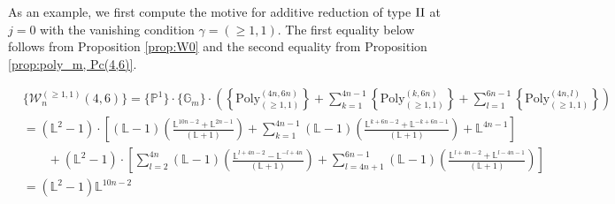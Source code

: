 \documentclass[a4paper,12pt]{amsart}
\theoremstyle{definition}
\newcommand{\cW}{\mathcal{W}}
\newcommand{\Me}{\overline{\mathcal{M}}_{1,1}}
\newcommand{\II}{{\mathop{\rm II}}}
\newcommand{\Pb}{\mathbb{P}}
\newcommand{\Gb}{\mathbb{G}}
\newcommand{\Lb}{\mathbb{L}}
\DeclareMathOperator{\PGL}{PGL}
\begin{document}
	As an example, we first compute the motive for additive reduction of type $\II$ at $j=0$ with the vanishing condition $\gamma = (\ge 1,1)$. The first equality below follows from Proposition \ref{prop:W0} and the second equality from Proposition \ref{prop:poly_m, Pc(4,6)}. 
	
	\begin{align*}
		&\{\cW_{n}^{(\ge 1,1)}(4,6)\}= \{\Pb^1\} \cdot \{\Gb_m\} \cdot \left(\left\{\mathrm{Poly}_{(\ge 1,1)}^{(4n,6n)}\right\}+\sum_{k=1}^{4n-1}\left\{\mathrm{Poly}_{(\ge 1,1)}^{(k,6n)}\right\}+\sum_{l=1}^{6n-1}\left\{\mathrm{Poly}_{(\ge 1,1)}^{(4n,l)}\right\}\right)\\
		&= (\Lb^2-1) \cdot \left[(\Lb - 1)\left( \frac{\Lb^{10n-2} + \Lb^{2n-1}}{(\Lb+1)} \right) + \sum_{k=1}^{4n-1} (\Lb - 1)  \left(\frac{\Lb^{k+6n-2} + \Lb^{-k+6n-1}}{(\Lb+1)}\right) + \Lb^{4n-1} \right]\\
		&\phantom{=}\text{ } + (\Lb^2-1) \cdot \left[ \sum_{l=2}^{4n}  (\Lb - 1)   \left(\frac{\Lb^{l+4n-2} - \Lb^{-l+4n}}{(\Lb+1)} \right) + \sum_{l=4n+1}^{6n-1} (\Lb - 1)  \left(\frac{\Lb^{l+4n-2} + \Lb^{l-4n-1}}{(\Lb+1)} \right) \right]\\
		&=  (\Lb^2 - 1)\Lb^{10n-2}
	\end{align*}
	
\end{document}
